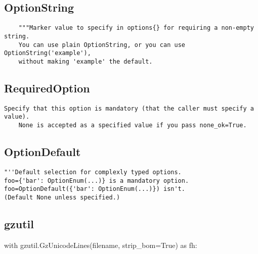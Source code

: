 \subsection{OptionString}
\begin{verbatim}
    """Marker value to specify in options{} for requiring a non-empty string.
    You can use plain OptionString, or you can use OptionString('example'),
    without making 'example' the default.
\end{verbatim}



\subsection{RequiredOption}
\begin{verbatim}
Specify that this option is mandatory (that the caller must specify a value).
    None is accepted as a specified value if you pass none_ok=True.
\end{verbatim}



\subsection{OptionDefault}
\begin{verbatim}
"''Default selection for complexly typed options.
foo={'bar': OptionEnum(...)} is a mandatory option.
foo=OptionDefault({'bar': OptionEnum(...)}) isn't.
(Default None unless specified.)
\end{verbatim}



\subsection{gzutil}
\begin{python}
with gzutil.GzUnicodeLines(filename, strip_bom=True) as fh:
\end{python}
